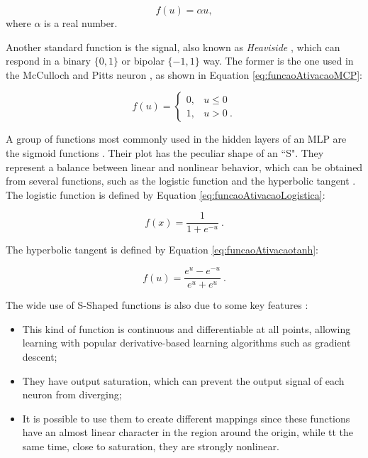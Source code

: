 \begin{equation}
	\label{eq:funcaoAtivacaoLinear}
	f(u) = \alpha u,
\end{equation}
where $\alpha$ is a real number.

Another standard function is the signal, also known as \textit{Heaviside} \cite{haykin}, which can respond in a binary $\{0, 1\}$ or bipolar $\{-1, 1\}$ way. The former is the one used in the McCulloch and Pitts neuron \cite{McCulloch1990}, as shown in Equation \ref{eq:funcaoAtivacaoMCP}:

\begin{equation}
	\label{eq:funcaoAtivacaoMCP}
	f(u) = \left\{\begin{matrix}
		0, & u \leq 0    \\
		1, & u > 0 \: .
	\end{matrix}\right.
\end{equation}

A group of functions most commonly used in the hidden layers of an MLP are the sigmoid functions \cite{haykin, Castro2006FundamentalsON}. Their plot has the peculiar shape of an ``S". They represent a balance between linear and nonlinear behavior, which can be obtained from several functions, such as the logistic function and the hyperbolic tangent \cite{Jeffrey2008}. The logistic function is defined by Equation \ref{eq:funcaoAtivacaoLogistica}:

\begin{equation}
	\label{eq:funcaoAtivacaoLogistica}
	f(x) = \frac{1}{1 + e^{-u}}\:.
\end{equation}

The hyperbolic tangent is defined by Equation \ref{eq:funcaoAtivacaotanh}:

\begin{equation}
\label{eq:funcaoAtivacaotanh}
	f(u) = \frac{e^u - e^{-u}}{e^u + e^{u}}\:.
\end{equation}

The wide use of S-Shaped functions is also due to some key features \cite{Menon1996}:

\begin{itemize}
    \item This kind of function is continuous and differentiable at all points, allowing learning with popular derivative-based learning algorithms such as gradient descent;
    \item They have output saturation, which can prevent the output signal of each neuron from diverging;
    \item It is possible to use them to create different mappings since these functions have an almost linear character in the region around the origin, while tt the same time, close to saturation, they are strongly nonlinear.
\end{itemize}

